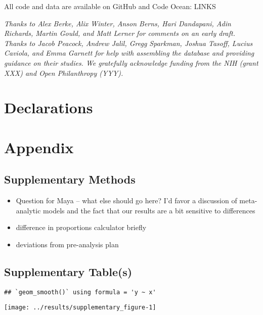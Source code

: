 \documentclass[sn-nature,pdflatex]{sn-jnl}
\begin{document}
\backmatter


All code and data are available on GitHub and Code Ocean: LINKS


\emph{Thanks to Alex Berke, Alix Winter, Anson Berns, Hari Dandapani,
Adin Richards, Martin Gould, and Matt Lerner for comments on an early
draft. Thanks to Jacob Peacock, Andrew Jalil, Gregg Sparkman, Joshua
Tasoff, Lucius Caviola, and Emma Garnett for help with assembling the
database and providing guidance on their studies. We gratefully
acknowledge funding from the NIH (grant XXX) and Open Philanthropy
(YYY).}

\section*{Declarations}\label{declarations}

\newpage

\section{Appendix}\label{appendix}

\subsection{Supplementary Methods}\label{supplementary-methods}

\begin{itemize}
\item
  Question for Maya -- what else should go here? I'd favor a discussion
  of meta-analytic models and the fact that our results are a bit
  sensitive to differences
\item
  difference in proportions calculator briefly
\item
  deviations from pre-analysis plan
\end{itemize}

\subsection{Supplementary Table(s)}\label{supplementary-tables}

\begin{verbatim}
## `geom_smooth()` using formula = 'y ~ x'
\end{verbatim}

\texttt{[image: ../results/supplementary\_figure-1]}
\end{document}
